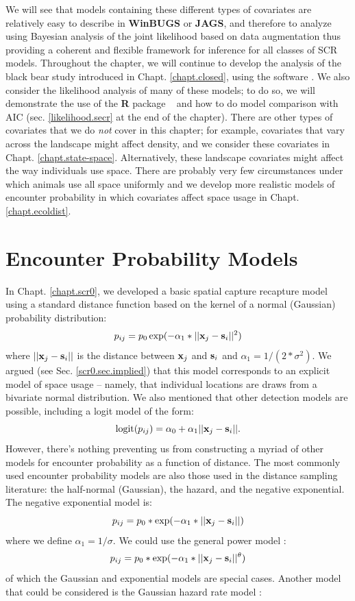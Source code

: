 We will see that models containing these different types of
covariates are relatively easy to describe in {\bf WinBUGS} or
{\bf JAGS}, and
therefore to analyze using Bayesian analysis of the joint likelihood
based on data augmentation thus providing a coherent and flexible
framework for inference for all classes of SCR models.  Throughout the
chapter, we will continue to develop the analysis of the black bear
study introduced in Chapt. \ref{chapt.closed}, using the software
\jags.  We also
consider the likelihood analysis of many of these models; to do so, we
will demonstrate the use of the {\bf R} package \secr~ and how to do model
comparison with AIC (sec. \ref{likelihood.secr} at the end of the chapter).
There are other types of covariates that we do {\it not} cover in this
chapter; for example, covariates that vary across the
landscape might affect density, and we consider these covariates in
Chapt. \ref{chapt.state-space}.
Alternatively, these landscape covariates might affect the way individuals use
space. There are probably very few circumstances under which animals use all 
space uniformly and we develop more realistic models of encounter
probability in which covariates affect space usage in Chapt. \ref{chapt.ecoldist}.


\section{Encounter Probability Models}
\label{covs.sec.detfunc}

In Chapt. \ref{chapt.scr0}, we developed a basic spatial capture
recapture model using a standard distance function based on the kernel
of a normal (Gaussian) probability distribution:
\[
p_{ij} = p_{0} \exp(-\alpha_{1} *||{\bf x}_{j}-{\bf s}_{i}||^2)
\]
where $||{\bf x}_{j}-{\bf s}_{i}||$ is the distance between ${\bf
  x}_{j}$ and ${\bf s}_{i}$ and
$\alpha_{1} = 1/(2*\sigma^2)$.
We argued (see Sec. \ref{scr0.sec.implied}) that this model corresponds to
an explicit model of space usage -- namely, that individual locations
are draws from a bivariate normal distribution. We also mentioned that
other detection models are possible, including a logit model of the
form:
\begin{equation}
	\mbox{logit}(p_{ij}) = \alpha_{0} + \alpha_1 ||{\bf x}_{j}-{\bf s}_{i} ||.
\label{covariates.eq.logit}
\end{equation}
However, there's nothing preventing us from constructing a myriad of
other models for encounter probability as a function of distance.
The most
commonly used encounter probability models
 are also those used in the distance
sampling literature: the half-normal (Gaussian), the hazard, and the negative
exponential.  The negative exponential model is: 
\[
p_{ij} = p_{0}*\exp(-\alpha_{1} *||{\bf x}_{j}-{\bf s}_{i}||)
\]
where we define
$\alpha_{1} = 1/\sigma$.
We could use the general power model \citep{russell_etal:2012}: 
\[
p_{ij} = p_0*\exp(-\alpha_{1} *||{\bf x}_{j}-{\bf s}_{i}||^{\theta} )
\]
of which the
Gaussian and exponential models are special cases.  Another model that
could be considered is the Gaussian hazard rate model \citep{hayes_buckland:1983}:

